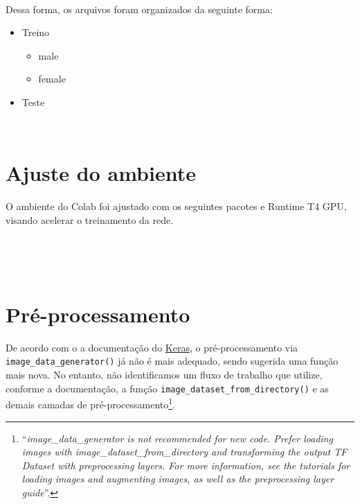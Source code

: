 \documentclass[
  a4paperpaper,
]{article}
\newenvironment{Shaded}{\begin{snugshade}}{\end{snugshade}}
\newcommand{\CommentTok}[1]{\textcolor[rgb]{0.37,0.37,0.37}{#1}}
\newcommand{\FunctionTok}[1]{\textcolor[rgb]{0.28,0.35,0.67}{#1}}
\newcommand{\NormalTok}[1]{\textcolor[rgb]{0.00,0.23,0.31}{#1}}
\newcommand{\SpecialCharTok}[1]{\textcolor[rgb]{0.37,0.37,0.37}{#1}}
\newcommand{\StringTok}[1]{\textcolor[rgb]{0.13,0.47,0.30}{#1}}
\providecommand{\tightlist}{%
  \setlength{\itemsep}{0pt}\setlength{\parskip}{0pt}}\usepackage{longtable,booktabs,array}
\begin{document}
~

Dessa forma, os arquivos foram organizados da seguinte forma:

\begin{itemize}
\tightlist
\item
  Treino

  \begin{itemize}
  \tightlist
  \item
    male
  \item
    female
  \end{itemize}
\item
  Teste
\end{itemize}

~

\section{Ajuste do ambiente}\label{ajuste-do-ambiente}

O ambiente do Colab foi ajustado com os seguintes pacotes e Runtime T4
GPU, visando acelerar o treinamento da rede.

~

\begin{Shaded}
\end{Shaded}

~

\section{Pré-processamento}\label{pruxe9-processamento}

De acordo com o a documentação do
\href{https://cran.r-project.org/web/packages/keras/keras.pdf}{Keras}, o
pré-processamento via \texttt{image\_data\_generator()} já não é mais
adequado, sendo sugerida uma função mais nova. No entanto, não
identificamos um fluxo de trabalho que utilize, conforme a documentação,
a função \texttt{image\_dataset\_from\_directory()} e as demais camadas
de pré-processamento\footnote{``\emph{image\_data\_generator is not
  recommended for new code. Prefer loading images with
  image\_dataset\_from\_directory and transforming the output TF Dataset
  with preprocessing layers. For more information, see the tutorials for
  loading images and augmenting images, as well as the preprocessing
  layer guide}''.}.
\end{document}
